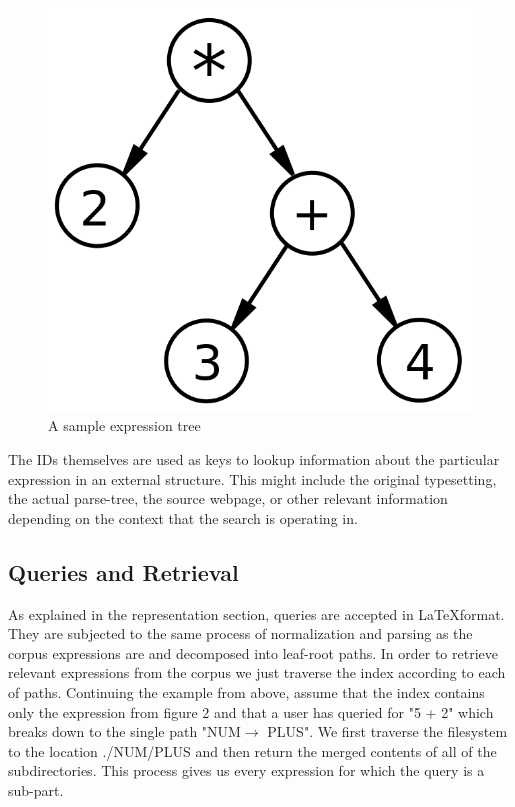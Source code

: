 \documentclass{sig-alternate}
\begin{document}
\begin{figure}
    \label{fig2}
	\centering
    \includegraphics[scale=0.2]{exprtree}
	\caption{A sample expression tree}
\end{figure}

The IDs themselves are used as keys to lookup information about the particular expression in an external structure. This might include the original typesetting, the actual parse-tree, the source webpage, or other relevant information depending on the context that the search is operating in.

\subsection{Queries and Retrieval}
As explained in the representation section, queries are accepted in \LaTeX format. They 
are subjected to the same process of normalization and parsing as the corpus expressions
are and decomposed into leaf-root paths. In order to retrieve relevant expressions from the corpus
we just traverse the index according to each of paths. Continuing the example from above, assume that
the index contains only the expression from figure 2 and that a user has queried for "5 + 2" which 
breaks down to the single path "NUM$\rightarrow$ PLUS". We first traverse the filesystem to the location
./NUM/PLUS and then return the merged contents of all of the subdirectories. This process gives us every expression for which the query is a sub-part. 
\end{document}
